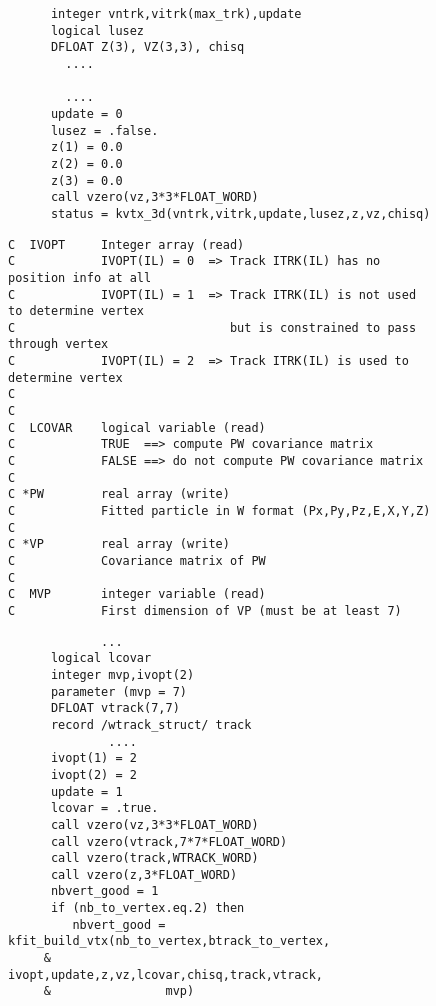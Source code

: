 \begin{figure}
\begin{tt}
\begin{verbatim}
      integer vntrk,vitrk(max_trk),update
      logical lusez
      DFLOAT Z(3), VZ(3,3), chisq
        ....

        ....
      update = 0
      lusez = .false.
      z(1) = 0.0
      z(2) = 0.0
      z(3) = 0.0
      call vzero(vz,3*3*FLOAT_WORD)
      status = kvtx_3d(vntrk,vitrk,update,lusez,z,vz,chisq)

\end{verbatim}
\end{tt}
\label{code:kvtx}
\end{figure}

\begin{figure}
\begin{tt}
\begin{verbatim}
C  IVOPT     Integer array (read)
C            IVOPT(IL) = 0  => Track ITRK(IL) has no position info at all
C            IVOPT(IL) = 1  => Track ITRK(IL) is not used to determine vertex
C                              but is constrained to pass through vertex
C            IVOPT(IL) = 2  => Track ITRK(IL) is used to determine vertex
C
C
C  LCOVAR    logical variable (read)
C            TRUE  ==> compute PW covariance matrix
C            FALSE ==> do not compute PW covariance matrix
C
C *PW        real array (write)
C            Fitted particle in W format (Px,Py,Pz,E,X,Y,Z)
C
C *VP        real array (write)
C            Covariance matrix of PW
C
C  MVP       integer variable (read)
C            First dimension of VP (must be at least 7)

\end{verbatim}
\end{tt}
\label{code:build}
\end{figure}

\begin{figure}
\begin{tt}
\begin{verbatim}
             ...
      logical lcovar
      integer mvp,ivopt(2)       
      parameter (mvp = 7)
      DFLOAT vtrack(7,7)
      record /wtrack_struct/ track
              ....
      ivopt(1) = 2
      ivopt(2) = 2
      update = 1
      lcovar = .true.
      call vzero(vz,3*3*FLOAT_WORD)
      call vzero(vtrack,7*7*FLOAT_WORD)
      call vzero(track,WTRACK_WORD)
      call vzero(z,3*FLOAT_WORD)
      nbvert_good = 1
      if (nb_to_vertex.eq.2) then
         nbvert_good = kfit_build_vtx(nb_to_vertex,btrack_to_vertex,
     &                ivopt,update,z,vz,lcovar,chisq,track,vtrack,
     &                mvp)

\end{verbatim}
\end{tt}
\label{code:doit}
\end{figure}

